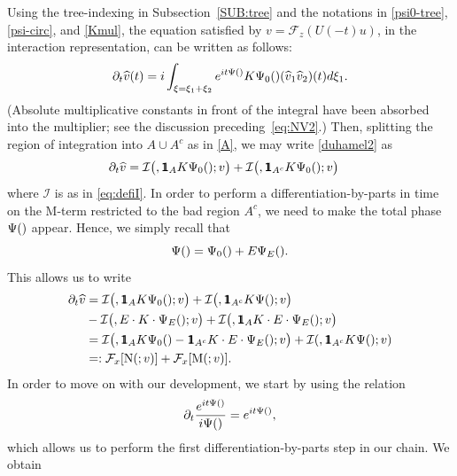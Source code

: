 \documentclass[a4paper,
11pt,  reqno]{amsart}
\makeatletter
\newcommand{\mathbbm}[1]{\mathchoice%
    {\hbox{\sffamily 1\kern-.40em 1}}%
    {\hbox{\sffamily 1\kern-.40em 1}}%
    {\hbox{\scriptsize\sffamily 1\kern-.30em 1}}%
    {\hbox{\tiny\sffamily 1\kern-.25em 1}}}%
\newcommand{\5}{\textup{V}}
\newcommand{\ft}{\widehat}
\newcommand{\ind}{\mathbbm 1}
\newcommand{\F}{\mathcal{F}}
\newcommand{\dt}{\partial_t}
\theoremstyle{remark}
\newcommand{\Ft}{{\mathcal{F}}}
\def\<#1>{\csname MH@symb@#1\endcsname}
\newcommand{\Ical}{\mathcal{I}}
\numberwithin{equation}{section}
\numberwithin{theorem}{section}
\newcommand{\MM}{\mathrm{M}}
\newcommand{\NN}{\mathrm{N}}
\makeatother
\begin{document}
Using the tree-indexing in Subsection~\ref{SUB:tree} and the notations in \eqref{psi0-tree}, \eqref{psi-circ}, and \eqref{Kmul}, the equation satisfied by $v=\F_z(U(-t)u)$, in the interaction representation, can be written as follows:
\begin{align}
\label{duhamel2}
\dt\ft v(t) =  i \int_{\xi = \xi_1 + \xi_2} e^{it \Psi(\<1>)}  K \Psi_0(\<1>)   (\widehat{v}_{1} \widehat{v}_{2}) (t)
d\xi_{1}.
\end{align}
(Absolute multiplicative constants in front of the integral have been absorbed into the multiplier; see the discussion preceding~\eqref{eq:NV2}.)
Then, splitting the region of integration into $A\cup A^c$ as in \eqref{A}, we may write \eqref{duhamel2} as 
\begin{align}
\dt\ft v
&
= 
\Ical\big( \<1>, \ind_A K \Psi_0(\<1>); v 
\big)
+ \Ical\big( \<1>, \ind_{A^c} K \Psi_0(\<1>) ;v 
\big)
\label{NFE000}
\end{align}
where $\Ical$ is as in \eqref{eq:defiI}. In order to perform a differentiation-by-parts in time on the $\MM$-term restricted to the bad region $A^c$, we need to make the total phase $\Psi(\<1>)$ appear. Hence, we simply recall that 
\[
\Psi(\<1>) = \Psi_0(\<1>) + E \Psi_E (\<1>).
\]
This allows us to write 
\begin{align}
\dt\ft v
&
= 
\Ical\big( \<1>, \ind_A K \Psi_0(\<1>); v 
\big)
+ \Ical\big( \<1>, \ind_{A^c} K \Psi (\<1>) ;v 
\big)
\\
& - \Ical \big(\<1>, E \cdot K \cdot \Psi_E(\<1>);v\big) + \Ical \big(\<1>, \ind_A K \cdot E \cdot \Psi_E(\<1>); v\big) 
\\
& 
= \Ical \big(\<1>, \ind_A K \Psi_0(\<1>) - \ind_{A^c} K \cdot E \cdot \Psi_E(\<1>);v\big) + \Ical(\<1>, \ind_{A^c} K \Psi(\<1>);v) 
\\
& 
=: \Ft_x[ \NN ( \<1>; v )] + \Ft_x[ \MM(\<1>; v) ].
\label{NFE001}
\end{align}
In order to move on with our development, we start by using the relation
$$
\dt\frac{e^{it\Psi(\<1>)}}{i\Psi(\<1>)}=e^{it\Psi(\<1>)},
$$ 
which allows us to perform the first differentiation-by-parts step in our chain. We obtain
\end{document}
